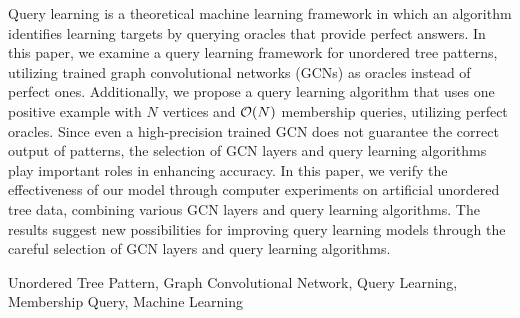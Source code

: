 \documentclass[submit]{ipsj}
\begin{document}
\begin{eabstract}
	Query learning is a theoretical machine learning framework in which an algorithm identifies learning targets by querying oracles that provide perfect answers. In this paper, we examine a query learning framework for unordered tree patterns, utilizing trained graph convolutional networks (GCNs) as oracles instead of perfect ones. Additionally, we propose a query learning algorithm that uses one positive example with $N$ vertices and ${\cal O}(N)$ membership queries, utilizing perfect oracles. Since even a high-precision trained GCN does not guarantee the correct output of patterns, the selection of GCN layers and query learning algorithms play important roles in enhancing accuracy. In this paper, we verify the effectiveness of our model through computer experiments on artificial unordered tree data, combining various GCN layers and query learning algorithms. The results suggest new possibilities for improving query learning models through the careful selection of GCN layers and query learning algorithms.
\end{eabstract}

\begin{ekeyword}
	Unordered Tree Pattern, Graph Convolutional Network, Query Learning, Membership Query, Machine Learning
\end{ekeyword}

\maketitle
























\end{document}
